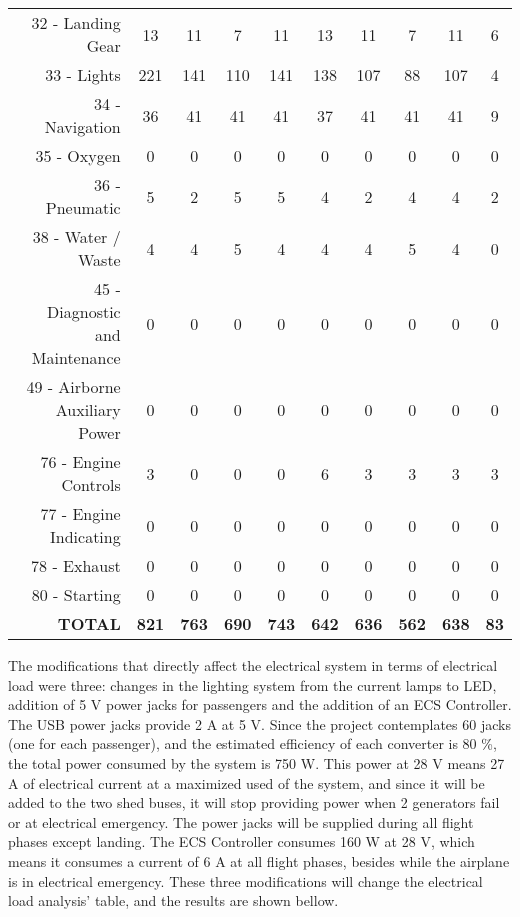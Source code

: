 \begin{table}[htbp]
\begin{tabular}{rccccccccc}
    32 - Landing Gear & 13    & 11    & 7     & 11    & 13    & 11    & 7     & 11    & 6 \\
    33 - Lights & 221   & 141   & 110   & 141   & 138   & 107   & 88    & 107   & 4 \\
    34 - Navigation & 36    & 41    & 41    & 41    & 37    & 41    & 41    & 41    & 9 \\
    35 - Oxygen & 0     & 0     & 0     & 0     & 0     & 0     & 0     & 0     & 0 \\
    36 - Pneumatic & 5     & 2     & 5     & 5     & 4     & 2     & 4     & 4     & 2 \\
    38 - Water / Waste & 4     & 4     & 5     & 4     & 4     & 4     & 5     & 4     & 0 \\
    45 - Diagnostic and Maintenance & 0     & 0     & 0     & 0     & 0     & 0     & 0     & 0     & 0 \\
    49 - Airborne Auxiliary Power & 0     & 0     & 0     & 0     & 0     & 0     & 0     & 0     & 0 \\
    76 - Engine Controls & 3     & 0     & 0     & 0     & 6     & 3     & 3     & 3     & 3 \\
    77 - Engine Indicating & 0     & 0     & 0     & 0     & 0     & 0     & 0     & 0     & 0 \\
    78 - Exhaust & 0     & 0     & 0     & 0     & 0     & 0     & 0     & 0     & 0 \\
    80 - Starting & 0     & 0     & 0     & 0     & 0     & 0     & 0     & 0     & 0 \\
    \textbf{TOTAL} & \textbf{821} & \textbf{763} & \textbf{690} & \textbf{743} & \textbf{642} & \textbf{636} & \textbf{562} & \textbf{638} & \textbf{83} \\
    \bottomrule
    \end{tabular}%
  \label{tab:CurrentEleLoads}%
\end{table}%

The modifications that directly affect the electrical system in terms of electrical load were three: changes in the lighting system from the current lamps to LED, addition of 5 V power jacks for passengers and the addition of an ECS Controller. The USB power jacks provide 2 A at 5 V. Since the project contemplates 60 jacks (one for each passenger), and the estimated efficiency of each converter is 80 \%, the total power consumed by the system is 750 W. This power at 28 V means 27 A of electrical current at a maximized used of the system, and since it will be added to the two shed buses, it will stop providing power when 2 generators fail or at electrical emergency. The power jacks will be supplied during all flight phases except landing.  The ECS Controller consumes 160 W at 28 V, which means it consumes a current of 6 A at all flight phases, besides while the airplane is in electrical emergency. These three modifications will change the electrical load analysis' table, and the results are shown bellow.

